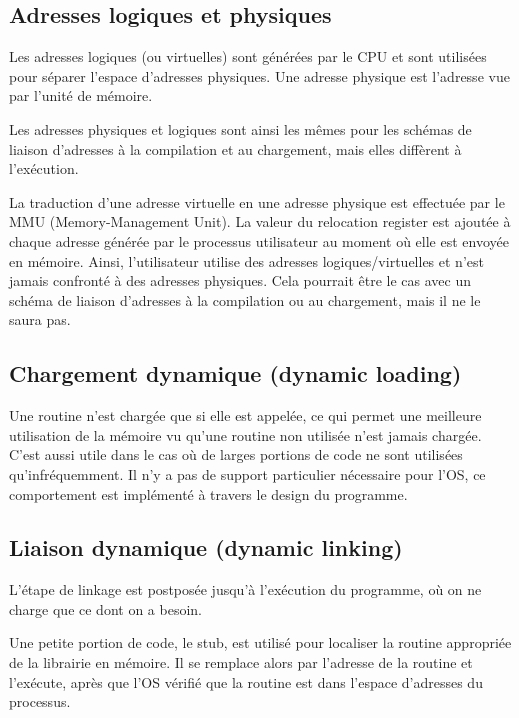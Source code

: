 
	\subsection{Adresses logiques et physiques}
	
	Les adresses logiques (ou virtuelles) sont générées par le CPU et sont utilisées pour séparer l'espace d'adresses physiques. Une adresse physique est l'adresse vue par l'unité de mémoire.
	
	Les adresses physiques et logiques sont ainsi les mêmes pour les schémas de liaison d'adresses à la compilation et au chargement, mais elles diffèrent à l'exécution.
	
	La traduction d'une adresse virtuelle en une adresse physique est effectuée par le MMU (Memory-Management Unit). La valeur du relocation register est ajoutée à chaque adresse générée par le processus utilisateur au moment où elle est envoyée en mémoire. Ainsi, l'utilisateur utilise des adresses logiques/virtuelles et n'est jamais confronté à des adresses physiques. Cela pourrait être le cas avec un schéma de liaison d'adresses à la compilation ou au chargement, mais il ne le saura pas.
	
	
	\subsection{Chargement dynamique (dynamic loading)}
	
	Une routine n'est chargée que si elle est appelée, ce qui permet une meilleure utilisation de la mémoire vu qu'une routine non utilisée n'est jamais chargée. C'est aussi utile dans le cas où de larges portions de code ne sont utilisées qu'infréquemment. Il n'y a pas de support particulier nécessaire pour l'OS, ce comportement est implémenté à travers le design du programme.
	
	\subsection{Liaison dynamique (dynamic linking)}
	
	L'étape de linkage est postposée jusqu'à l'exécution du programme, où on ne charge que ce dont on a besoin.
	
	Une petite portion de code, le stub, est utilisé pour localiser la routine appropriée de la librairie en mémoire. Il se remplace alors par l'adresse de la routine et l'exécute, après que l'OS vérifié que la routine est dans l'espace d'adresses du processus.
	
